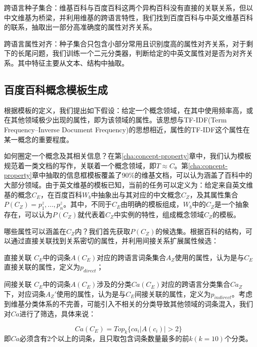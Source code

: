 {\heiti 跨语言种子集合：}维基百科与百度百科这两个异构百科没有直接的关联关系，但以中文维基为桥梁，并利用维基的跨语言特性，我们找到百度百科与中英文维基百科的联系，抽取出一部分高准确度的属性对齐关系。

{\heiti 跨语言属性对齐：}种子集合只包含小部分常用且识别度高的属性对齐关系，对于剩下的长尾问题，我们训练一个二元分类器，判断给定的中英文属性对是否为对齐关系。其中特征主要从文本、结构中抽取。

\subsection{百度百科概念模板生成}
\label{sec:domain-template}
根据模板的定义，我们提出如下假设：给定一个概念领域，在其中使用频率高，或在其他领域极少出现的属性，即为该领域的属性。该思想与TF-IDF(Term Frequency–Inverse Document Frequency)的思想相近，属性的TF-IDF这个属性在某一概念的重要程度。

如何圈定一个概念及其相关信息？在第\ref{cha:concept-property}章中，我们认为模板规范着一类文档的写作，关联着一个概念领域，即$T \approx C$。第\ref{cha:concept-property}章中抽取的信息框模板覆盖了90\%的维基文档，可以认为涵盖了百科中的大部分领域。由于英文维基的模板已知，当前的任务可以定义为：给定来自英文维基的概念$C_E$，在百度百科$W_b$中抽象出与其对应的中文概念$C_Z$，及其属性集合$P(C_Z)={p_1^z,...,p_n^z}$。其中，不同于$C_E$由明确的模板组成，$W_b$中的$C_Z$是一个抽象存在，可以认为$P(C_Z)$就代表着$C_Z$中实例的特性，组成概念领域$C_Z$的模板。

哪些属性可以涵盖在$C_Z$内？我们首先获取$P(C_Z)$的候选集。根据百科的结构，可以通过直接关联找到关系密切的属性，并利用间接关系扩展属性候选：

{\heiti 直接关联} $C_E$中的词条$A(C_E)$对应的跨语言词条集合$A_Z$使用的属性，认为是与$C_E$直接关联的属性，定义为$p_{direct}$；

{\heiti 间接关联} $C_E$中的词条$A(C_E)$涉及的分类$Ca(C_E)$对应的跨语言分类集合$Ca_Z$下，对应词条$A_Z'$使用的属性，认为是与$C_E$间接关联的属性，定义为$p_{indirect}$。考虑到维基分类体系的不完善，可能引入不相关的分类导致其他领域的词条混入，我们对$Ca$进行了筛选，具体来说：

\begin{equation}
Ca(C_E) = Top_k\{ ca_i |A(c_i)| > 2 \} 
\end{equation}
即$Ca$必须含有2个以上的词条，且只取包含词条数量最多的前$k(k=10)$个分类。


